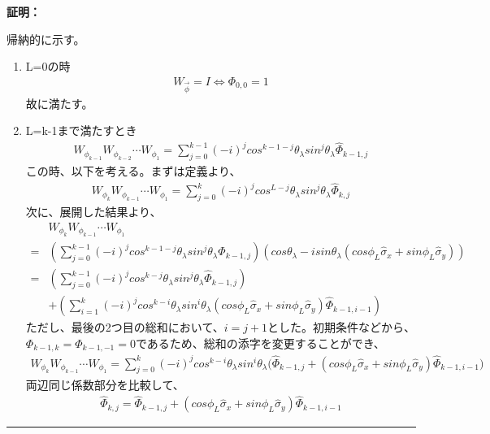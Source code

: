 \documentclass[a4paper,10.5pt]{article}
\numberwithin{equation}{section}
\newenvironment{proofbox}
{\begin{prooflabel}\textbf{証明：}\end{prooflabel}\vspace{0.8em}}
{\par\vspace{1em}\hrule\vspace{1em}}
\begin{document}
\begin{proofbox}
    帰納的に示す。
    \begin{enumerate}
        \item L=0の時
        \begin{align*}
            W_{\vec{\phi}}=I\iff \Phi_{0,0}=1
        \end{align*}
        故に満たす。
        \item L=k-1まで満たすとき\\
        \begin{align*}
            W_{\phi_{k-1}}W_{\phi_{k-2}}\cdots W_{\phi_{1}}=\sum_{j=0}^{k-1}(-i)^{j}cos^{k-1-j}\theta_{\lambda}sin^{j}\theta_{\lambda}\hat{\Phi}_{k-1,j}
        \end{align*}
        この時、以下を考える。まずは定義より、
        \begin{align*}
            W_{\phi_{k}}W_{\phi_{k-1}}\cdots W_{\phi_{1}}=\sum_{j=0}^{k}(-i)^{j}cos^{L-j}\theta_{\lambda}sin^{j}\theta_{\lambda}\hat{\Phi}_{k,j}
        \end{align*}
        次に、展開した結果より、
        \begin{align*}
            &W_{\phi_{k}}W_{\phi_{k-1}}\cdots W_{\phi_{1}}\\
            =&(\sum_{j=0}^{k-1}(-i)^{j}cos^{k-1-j}\theta_{\lambda}sin^{j}\theta_{\lambda}\hat{\Phi}_{k-1,j})(cos\theta_{\lambda}-isin\theta_{\lambda}(cos\phi_{L}\hat{\sigma}_{x}+sin\phi_{L}\hat{\sigma}_{y}))\\
            =&(\sum_{j=0}^{k-1}(-i)^{j}cos^{k-j}\theta_{\lambda}sin^{j}\theta_{\lambda}\hat{\Phi}_{k-1,j})\\
            &+(\sum_{i=1}^{k}(-i)^{j}cos^{k-i}\theta_{\lambda}sin^{i}\theta_{\lambda}(cos\phi_{L}\hat{\sigma}_{x}+sin\phi_{L}\hat{\sigma}_{y})\hat{\Phi}_{k-1,i-1})
        \end{align*}
        ただし、最後の2つ目の総和において、$i=j+1$とした。初期条件などから、$\Phi_{k-1,k}=\Phi_{k-1,-1}=0$であるため、総和の添字を変更することができ、
        \begin{align*}
            W_{\phi_{k}}W_{\phi_{k-1}}\cdots W_{\phi_{1}}
            =\sum_{j=0}^{k}(-i)^{j}cos^{k-i}\theta_{\lambda}sin^{i}\theta_{\lambda}\big(\hat{\Phi}_{k-1,j}+(cos\phi_{L}\hat{\sigma}_{x}+sin\phi_{L}\hat{\sigma}_{y})\hat{\Phi}_{k-1,i-1} \big)
        \end{align*}
        両辺同じ係数部分を比較して、
        \begin{align*}
            \hat{\Phi}_{k,j}=\hat{\Phi}_{k-1,j}+(cos\phi_{L}\hat{\sigma}_{x}+sin\phi_{L}\hat{\sigma}_{y})\hat{\Phi}_{k-1,i-1} 

\end{align*}
\end{enumerate}
\end{proofbox}
\end{document}
